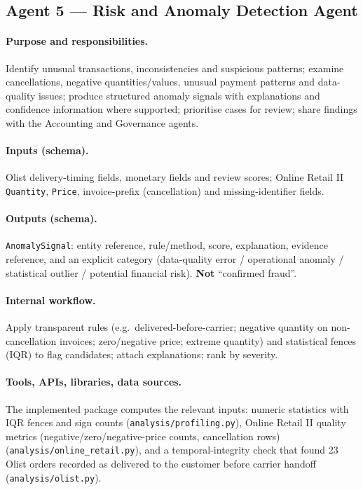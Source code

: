 \documentclass[11pt,a4paper]{article}
\newcommand{\code}[1]{\texttt{#1}}
\begin{document}
\subsection{Agent 5 --- Risk and Anomaly Detection Agent}
\paragraph{Purpose and responsibilities.} Identify unusual transactions, inconsistencies and suspicious patterns; examine cancellations, negative quantities/values, unusual payment patterns and data-quality issues; produce structured anomaly signals with explanations and confidence information where supported; prioritise cases for review; share findings with the Accounting and Governance agents.

\paragraph{Inputs (schema).} Olist delivery-timing fields, monetary fields and review scores; Online Retail II \code{Quantity}, \code{Price}, invoice-prefix (cancellation) and missing-identifier fields.

\paragraph{Outputs (schema).} \code{AnomalySignal}: entity reference, rule/method, score, explanation, evidence reference, and an explicit category (data-quality error / operational anomaly / statistical outlier / potential financial risk). \textbf{Not} ``confirmed fraud''.

\paragraph{Internal workflow.} Apply transparent rules (e.g.\ delivered-before-carrier; negative quantity on non-cancellation invoices; zero/negative price; extreme quantity) and statistical fences (IQR) to flag candidates; attach explanations; rank by severity.

\paragraph{Tools, APIs, libraries, data sources.} The implemented package computes the relevant inputs: numeric statistics with IQR fences and sign counts (\code{analysis/profiling.py}), Online Retail II quality metrics (negative/zero/negative-price counts, cancellation rows) (\code{analysis/online\_retail.py}), and a temporal-integrity check that found 23 Olist orders recorded as delivered to the customer before carrier handoff (\code{analysis/olist.py}).
\end{document}
